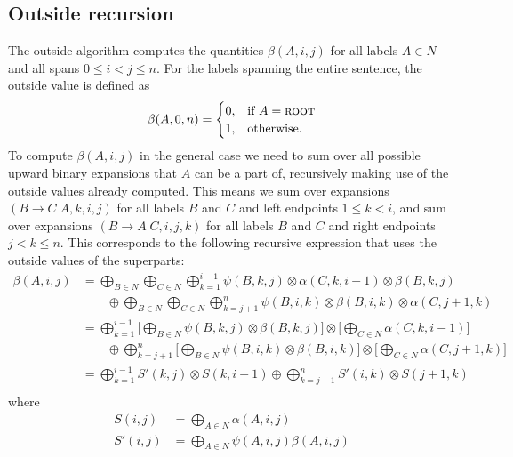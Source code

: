 \subsection{Outside recursion}
  The outside algorithm computes the quantities $\beta(A,i,j)$ for all labels $A \in N$ and all spans $0 \leq i < j \leq n$. For the labels spanning the entire sentence, the outside value is defined as
  \begin{align*}
    \beta(A, 0, n) =
    \begin{cases}
      0, & \text{if}\ A = \textsc{root} \\
      1, & \text{otherwise}.
    \end{cases}
  \end{align*}
  To compute $\beta(A, i, j)$ in the general case we need to sum over all possible upward binary expansions that $A$ can be a part of, recursively making use of the outside values already computed. This means we sum over expansions $(B \to C \; A, k, i, j)$ for all labels $B$ and $C$ and left endpoints $1 \leq k < i$, and sum over expansions $(B \to A \; C, i, j, k)$ for all labels $B$ and $C$ and right endpoints $j < k \leq n$. This corresponds to the following recursive expression that uses the outside values of the superparts:
  \begin{align*}
    \beta(A, i, j)
      &= \bigoplus_{B \in N} \bigoplus_{C \in N} \bigoplus_{k=1}^{i-1} \psi(B, k, j) \otimes \alpha(C, k, i-1) \otimes \beta(B, k, j) \\
        &\qquad \oplus \bigoplus_{B \in N} \bigoplus_{C \in N} \bigoplus_{k=j+1}^{n} \psi(B, i, k) \otimes \beta(B, i, k) \otimes \alpha(C, j+1, k) \\
      &=  \bigoplus_{k=1}^{i-1}  \Bigg[ \bigoplus_{B \in N} \psi(B, k, j)  \otimes \beta(B, k, j) \Bigg] \otimes \Bigg[ \bigoplus_{C \in N} \alpha(C, k, i-1) \Bigg] \\
        &\qquad \oplus \bigoplus_{k=j+1}^{n}  \Bigg[ \bigoplus_{B \in N}  \psi(B, i, k) \otimes \beta(B, i, k) \Bigg] \otimes  \Bigg[  \bigoplus_{C \in N} \alpha(C, j+1, k) \Bigg] \\
      &=  \bigoplus_{k=1}^{i-1}  S'(k, j) \otimes S(k, i-1) \oplus \bigoplus_{k=j+1}^{n} S'(i, k) \otimes  S(j+1, k) \\
  \end{align*}
  where
  \begin{align*}
      S(i, j) &= \bigoplus_{A \in N} \alpha(A, i, j) \\
      S'(i, j) &= \bigoplus_{A \in N} \psi(A, i, j) \beta(A, i, j)
  \end{align*}


